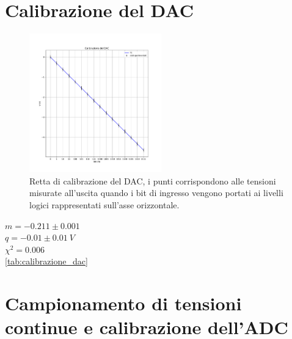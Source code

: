 \documentclass[journal]{IEEEtran}
\begin{document}

\section{Calibrazione del DAC}

\begin{figure}[t]%
\centering
\begin{center}
\includegraphics[width=0.51\textwidth]{analysis/output/calibrazione_dac.pdf}
\end{center}
\caption{Retta di calibrazione del DAC, i punti corrispondono alle tensioni misurate all'uscita quando i bit di ingresso vengono portati ai livelli logici rappresentati sull'asse orizzontale.}
\label{fig:graph_calibrazione_dac}
\end{figure}

$ m = -0.211 \pm 0.001 $ \\
$ q = -0.01 \pm 0.01 \ V $ \\
$ \chi^{2} = 0.006 $ \\

\ref{tab:calibrazione_dac}


\section{Campionamento di tensioni continue e calibrazione dell'ADC}
\end{document}
